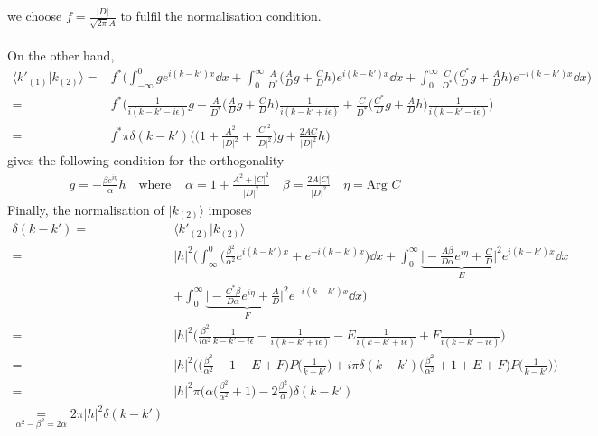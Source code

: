 we choose $f = \frac{|D|}{\sqrt{2\pi} A}$ to fulfil the normalisation condition. \\\\
On the other hand, 
\begin{equation}
\begin{split}
\langle k'_{(1)} | k_{(2)} \rangle = &
f^*\bigg( \int_{-\infty}^0 g e^{i(k-k')x} \dd x + \int_0^{\infty} \frac{A}{D^*}\big(\frac{A}{D}g + \frac{C}{D}h \big) e^{i(k-k')x} \dd x + \int^{\infty}_0 \frac{C}{D^*} \big( \frac{C^*}{D}g + \frac{A}{D}h \big) e^{-i(k - k')x} \dd x \bigg)   \\
= & f^*\Big( \frac{1}{i(k-k' - i\epsilon)} g - \frac{A}{D^*}\big(\frac{A}{D} g + \frac{C}{D} h \big) \frac{1}{i(k-k' + i\epsilon)} + \frac{C}{D^*}\big( \frac{C^*}{D}g + \frac{A}{D}h \big) \frac{1}{i(k-k' -i\epsilon)} \Big)    \\
= & f^* \pi \delta(k-k') \Big(  \big(1+ \frac{A^2}{|D|^2} + \frac{|C|^2}{|D|^2} \big) g + \frac{2AC}{|D|^2}h  \Big)
\end{split}
\end{equation}
gives the following condition for the orthogonality
\begin{equation}
\begin{split}
g = - \frac{\beta e^{i\eta}}{\alpha} h \quad \textrm{where }
& \alpha = 1 + \frac{A^2 + |C|^2}{|D|^2}  \quad
 \beta = \frac{2A|C|}{|D|^2}  \quad
\eta = \textrm{Arg } C
\end{split}
\end{equation}
Finally, the normalisation of $| k_{(2)} \rangle$ imposes 
\begin{equation}
\begin{split}
\delta(k - k') = & \langle k'_{(2)} | k_{(2)} \rangle \\
= & |h|^2 \bigg( \int_{\infty}^0 \Big( \frac{\beta^2}{\alpha^2} e^{i(k-k')x} + e^{-i(k-k')x} \Big) \dd x 
+ \int_0^{\infty} \underbrace{\Big|-\frac{A\beta}{D\alpha} e^{i\eta} + \frac{C}{D}\Big|^2}_{\text{$E$}} e^{i(k-k')x} \dd x \\
& + \int_0^{\infty}\underbrace{\Big|-\frac{C^*\beta}{D\alpha} e^{i\eta} + \frac{A}{D}\Big|^2}_{\text{$F$}} e^{-i(k-k')x}\dd x \bigg) \\
= & |h|^2 \bigg(\frac{\beta^2}{i \alpha^2}\frac{1}{k-k'-i\epsilon} - \frac{1}{i(k-k'+i\epsilon)} - E\frac{1}{i(k-k'+i\epsilon)} + F \frac{1}{i(k-k'-i\epsilon)} \bigg)   \\
= & |h|^2 \bigg( \Big(\frac{\beta^2}{\alpha^2} - 1 - E + F \Big) P\big(\frac{1}{k-k'}\big) + i\pi \delta(k-k')\Big(\frac{\beta^2}{\alpha^2} + 1 + E + F \Big) P\big(\frac{1}{k-k'}\big) \bigg)  \\
= & |h|^2\pi \bigg( \alpha\Big(\frac{\beta^2}{\alpha^2} + 1 \Big) - 2\frac{\beta^2}{\alpha}  \bigg) \delta (k-k')\\
\underset{\alpha^2 - \beta^2 = 2\alpha}{=}  2\pi|h|^2 \delta(k-k')
\end{split}
\end{equation}
